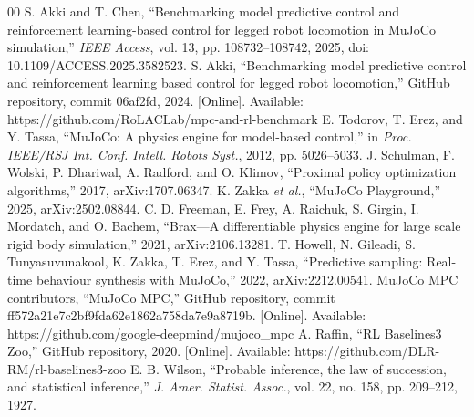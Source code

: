 \documentclass[conference]{IEEEtran}
\begin{document}
\begin{thebibliography}{00}
 S. Akki and T. Chen, ``Benchmarking model predictive control and reinforcement learning-based control for legged robot locomotion in MuJoCo simulation,'' \textit{IEEE Access}, vol. 13, pp. 108732--108742, 2025, doi: 10.1109/ACCESS.2025.3582523.
 S. Akki, ``Benchmarking model predictive control and reinforcement learning based control for legged robot locomotion,'' GitHub repository, commit 06af2fd, 2024. [Online]. Available: https://github.com/RoLACLab/mpc-and-rl-benchmark
 E. Todorov, T. Erez, and Y. Tassa, ``MuJoCo: A physics engine for model-based control,'' in \textit{Proc. IEEE/RSJ Int. Conf. Intell. Robots Syst.}, 2012, pp. 5026--5033.
 J. Schulman, F. Wolski, P. Dhariwal, A. Radford, and O. Klimov, ``Proximal policy optimization algorithms,'' 2017, arXiv:1707.06347.
 K. Zakka \textit{et al.}, ``MuJoCo Playground,'' 2025, arXiv:2502.08844.
 C. D. Freeman, E. Frey, A. Raichuk, S. Girgin, I. Mordatch, and O. Bachem, ``Brax---A differentiable physics engine for large scale rigid body simulation,'' 2021, arXiv:2106.13281.
 T. Howell, N. Gileadi, S. Tunyasuvunakool, K. Zakka, T. Erez, and Y. Tassa, ``Predictive sampling: Real-time behaviour synthesis with MuJoCo,'' 2022, arXiv:2212.00541.
 MuJoCo MPC contributors, ``MuJoCo MPC,'' GitHub repository, commit ff572a21e7c2bf9fda62e1862a758da7e9a8719b. [Online]. Available: https://github.com/google-deepmind/mujoco\_mpc
 A. Raffin, ``RL Baselines3 Zoo,'' GitHub repository, 2020. [Online]. Available: https://github.com/DLR-RM/rl-baselines3-zoo
 E. B. Wilson, ``Probable inference, the law of succession, and statistical inference,'' \textit{J. Amer. Statist. Assoc.}, vol. 22, no. 158, pp. 209--212, 1927.
\end{thebibliography}
\end{document}
